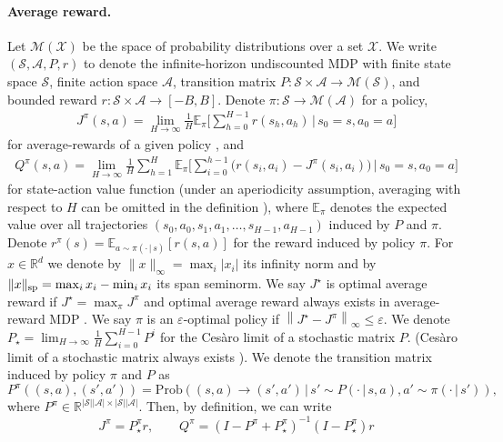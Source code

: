 \documentclass{article}
\theoremstyle{definition}
\theoremstyle{remark}
\newcommand{\expec}{\mathbb{E}}
\newcommand{\real}{\mathbb{R}}
\newcommand{\cA}{\mathcal{A}}
\newcommand{\cS}{\mathcal{S}}
\newcommand{\cM}{\mathcal{M}}
\newcommand{\cX}{\mathcal{X}}
\newcommand*{\infn}[1]{\left\|{#1}\right\|_{\infty}}
\renewcommand{\sp}[1]{\|{#1}\|_\text{\rm sp}}
\begin{document}
\paragraph{Average reward.}
Let $\cM(\cX)$ be the space of probability distributions over a set $\cX$. We write $(\cS, \cA, P, r)$ to denote the infinite-horizon undiscounted MDP with finite state space $\cS$, finite action space $\cA$, transition matrix $P\colon \cS \times \cA \rightarrow \cM(\cS)$, and bounded reward $r\colon  \cS \times \cA \rightarrow [-B,B]$. Denote $\pi\colon \cS \rightarrow \cM(\cA)$ for a policy, 
\begin{align*}
    J^{\pi}(s,a)=\lim_{H\rightarrow \infty} \frac{1}{H}\expec_{\pi}\bigg[\sum^{H-1}_{h=0}  r(s_h, a_h) \,\Big|\, s_0=s, a_0=a\bigg]
\end{align*}
for average-rewards of a given policy \cite[Section 9.1]{Puterman2014}, and \begin{align*}
Q^\pi(s,a)=\lim _{H\rightarrow \infty} \frac{1}{H}\sum_{h=1}^{H} \expec_\pi \bigg[\sum^{h-1}_{i=0}\big(r(s_i,a_i)-J^{\pi}(s_i,a_i)\big)\,\Big|\, s_0=s, a_0=a\bigg]    
\end{align*}
for state-action value function (under an aperiodicity assumption, averaging with respect to $H$ can be omitted in the definition \cite[Section 8.2]{Puterman2014}), where $\expec_{\pi}$ denotes the expected value over all trajectories $(s_0, a_0, s_1, a_1, \dots, s_{H-1}, a_{H-1})$ induced by $P$ and $\pi$. Denote $r^{\pi}(s)=\mathbb{E}_{a \sim \pi(\cdot\,|\,s) }\left[r(s,a)\right]$ for the reward induced by policy $\pi$. For $x\in\real^d$ we denote by $\|x\|_{\infty}=\max_{i}|x_i|$ its infinity norm and by $\sp{x}=\max_{i}x_i-\min_{i}x_i$ its  span seminorm.  We say $J^{\star}$ is optimal average reward if $J^{\star}=\max_{\pi}J^{\pi}$ and optimal average reward always exists in average-reward MDP \citep[Section 9.1]{Puterman2014}. We say $\pi$ is an $\varepsilon$-optimal policy if $\infn{J^{\star}-J^{\pi}} \le \varepsilon$. We denote  $P_{\star}= 
\lim_{H\rightarrow \infty}\frac{1}{H} \sum^{H-1}_{i=0}P^i$
for the Ces\`aro limit of a stochastic matrix $P$. (Ces\`aro limit of a stochastic matrix always exists \cite[Theorem A.6]{Puterman2014}). We denote the transition matrix induced by policy $\pi$ and $P$ as
\[
P^{\pi}((s,a), (s',a'))=
\mathrm{Prob}((s,a)\rightarrow (s',a')\,|\,
s'\sim P(\cdot\,|\,s,a),a' \sim \pi(\cdot\,|\,s')),
\]
where $P^{\pi} \in \mathbb{R}^{|\cS||\cA| \times |\cS||\cA|}$.
 Then, by definition, we can write  \cite[Section 8.2]{Puterman2014}
\[J^\pi=P^\pi_{\star}r, \qquad Q^\pi=(I-P^\pi+P^{\pi}_\star)^{-1}(I-P_\star^\pi)r
\]
\end{document}
